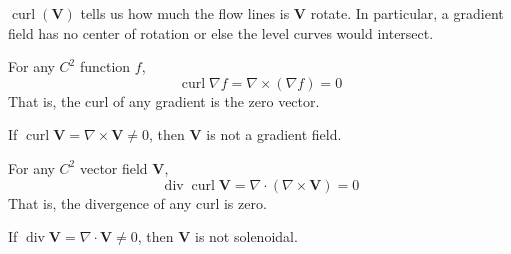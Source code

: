 \begin{marginfigure}
	$\operatorname{curl}(\mathbf{V})$ tells us how much the flow lines is $\mathbf{V}$ rotate. In particular, a gradient field has no center of rotation or else the level curves would intersect.
\end{marginfigure}

\begin{prop}
	For any $C^2$ function $f$,
	\[\operatorname{curl} \nabla f = \nabla \times(\nabla f)=0\]
	That is, the curl of any gradient is the zero vector.
\end{prop}

\begin{cor}
	If $\operatorname{curl} \mathbf{V} = \nabla \times \mathbf{V} \neq 0$, then $\mathbf{V}$ is not a gradient field.
\end{cor}

\begin{prop}
	For any $C^2$ vector field $\mathbf{V}$,
	\[\operatorname{div} \operatorname{curl} \mathbf{V}=\nabla \cdot(\nabla \times \mathbf{V})=0\]
	That is, the divergence of any curl is zero.
\end{prop}

\begin{cor}
	If $\operatorname{div} \mathbf{V} = \nabla \cdot \mathbf{V} \neq 0$, then $\mathbf{V}$ is not solenoidal.
\end{cor}